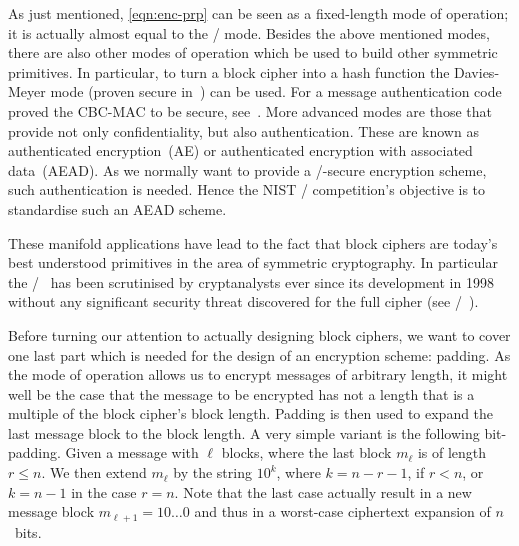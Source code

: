 As just mentioned, \cref{eqn:enc-prp} can be seen as a fixed-length mode of operation; it is actually almost equal to the \CTR/ mode.
Besides the above mentioned modes, there are also other modes of operation which be used to build other symmetric primitives.
In particular, to turn a block cipher into a hash function the Davies-Meyer mode (proven secure in~\cite{C:BlaRogShr02}) can be used.
For a message authentication code \citeauthor{C:BelKilRog94} proved the CBC-MAC to be secure, see~\cite{C:BelKilRog94}.
More advanced modes are those that provide not only confidentiality, but also authentication.
These are known as authenticated encryption~(AE) or authenticated encryption with associated data~(AEAD).
As we normally want to provide a \CCA/-secure encryption scheme, such authentication is needed.
Hence the NIST \LWC/ competition's objective is to standardise such an AEAD scheme.

These manifold applications have lead to the fact that block ciphers are today's best understood primitives in the area of symmetric cryptography.
In particular the \AES/~ has been scrutinised by cryptanalysts ever since its development in 1998~\cite{CARDIS:DaeRij98} without any significant security threat discovered for the full cipher (see \eg/~).

Before turning our attention to actually designing block ciphers, we want to cover one last part which is needed for the design of an encryption scheme: padding.
As the mode of operation allows us to encrypt messages of arbitrary length, it might well be the case that the message to be encrypted has not a length that is a multiple of the block cipher's block length.
Padding is then used to expand the last message block to the block length.
A very simple variant is the following bit-padding.
Given a message with $\ell$ blocks, where the last block $m_\ell$ is of length $r \leqslant n$.
We then extend $m_\ell$ by the string $10^k$, where $k = n-r-1$, if $r < n$, or $k = n-1$ in the case $r=n$.
Note that the last case actually result in a new message block $m_{\ell+1} = 10 \ldots 0$ and thus in a worst-case ciphertext expansion of $n$~bits.

